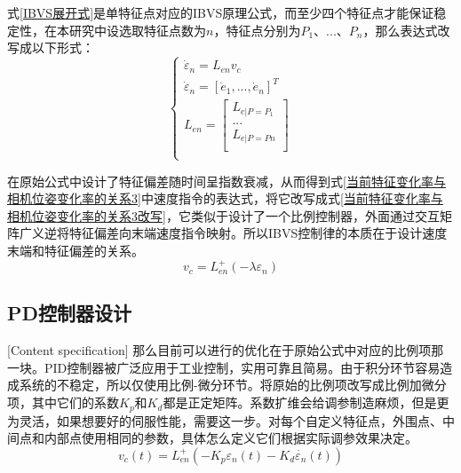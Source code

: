 \documentclass[fontset=fandol,type=bachelor,campus=harbin,bsmainpagenumberline=true]{hithesisbook}
\begin{document}
式\ref{IBVS展开式}是单特征点对应的IBVS原理公式，而至少四个特征点才能保证稳定性\cite{chaumette2006visual}，在本研究中设选取特征点数为$n$，特征点分别为$P_1$、...、$P_n$，那么表达式改写成以下形式：
\begin{equation}
\left\{ \begin{array}{c}
	\dot{\varepsilon}_n=L_{en}v_c\\
	\dot{\varepsilon}_n=\left[ \dot{e}_1,...,\dot{e}_n \right] ^T\\
	L_{en}=\left[ \begin{array}{c}
	L_{e|P=P_1}\\
	...\\
	L_{e|P=Pn}\\
\end{array} \right]\\
\end{array} \right.  
\label{IBVS多特征点展开式}
\end{equation}


在原始公式中设计了特征偏差随时间呈指数衰减，从而得到式\ref{当前特征变化率与相机位姿变化率的关系3}中速度指令的表达式，将它改写成式\ref{当前特征变化率与相机位姿变化率的关系3改写}，它类似于设计了一个比例控制器，外面通过交互矩阵广义逆将特征偏差向末端速度指令映射。所以IBVS控制律的本质在于设计速度末端和特征偏差的关系。
\begin{equation}
v_c=L_{en}^{+}\left( -\lambda \varepsilon_n \right) 
\label{当前特征变化率与相机位姿变化率的关系3改写}
\end{equation}

\subsection{PD控制器设计}[Content specification]
那么目前可以进行的优化在于原始公式中对应的比例项那一块。PID控制器被广泛应用于工业控制，实用可靠且简易。由于积分环节容易造成系统的不稳定，所以仅使用比例-微分环节。将原始的比例项改写成比例加微分项，其中它们的系数$K_p$和$K_d$都是正定矩阵。系数扩维会给调参制造麻烦，但是更为灵活，如果想要好的伺服性能，需要这一步。对每个自定义特征点，外围点、中间点和内部点使用相同的参数，具体怎么定义它们根据实际调参效果决定。
\begin{equation}
v_c\left( t \right) =L_{en}^{+}\left( -K_p\varepsilon_n\left( t \right) -K_d\dot{\varepsilon_n}\left( t \right) \right) 
\label{PD控制律}
\end{equation}
\end{document}
